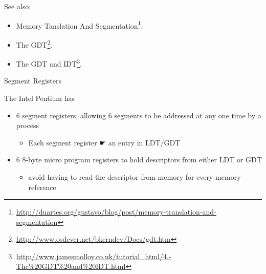 See also:
\begin{itemize}
\item Memory Tanslation And Segmentation\footnote{\url{http://duartes.org/gustavo/blog/post/memory-translation-and-segmentation}}.
\item The GDT\footnote{\url{http://www.osdever.net/bkerndev/Docs/gdt.htm}}.
\item The GDT and IDT\footnote{\url{http://www.jamesmolloy.co.uk/tutorial_html/4.-The\%20GDT\%20and\%20IDT.html}}.
\end{itemize}

\begin{frame}{Segment Registers}
  \begin{iblock}{The Intel Pentium has}
    \begin{itemize}
    \item \alert{6 segment registers}, allowing 6 segments to be addressed at
      any one time by a process
      \begin{itemize}
      \item Each segment register {☛} an entry in LDT/GDT
      \end{itemize}
    \item \alert{6 8-byte micro program registers} to hold descriptors from either LDT or GDT
      \begin{itemize}
      \item avoid having to read the descriptor from memory for every memory reference
      \end{itemize}
    \end{itemize}
  \end{iblock}
  \begin{center}
  \end{center}
\end{frame}


